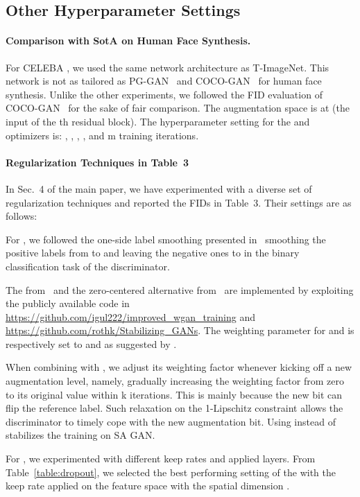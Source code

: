 \documentclass{article}
\begin{document}
\begin{center}
\subsection{Other Hyperparameter Settings}\label{subsec:regsettings}

\paragraph{Comparison with SotA on Human Face Synthesis.}
For CELEBA , we used the same network architecture as T-ImageNet. This network is not as tailored as PG-GAN~\cite{karras2018progressive} and COCO-GAN~\cite{lin2019cocogan} for human face synthesis. Unlike the other experiments, we followed the FID evaluation of COCO-GAN~\cite{lin2019cocogan} for the sake of fair comparison. The augmentation space is at  (the input of the th residual block). The hyperparameter setting for the  and  optimizers is: , , , ,  and \unit{m} training iterations.
\paragraph{Regularization Techniques in Table~3}
In Sec.~4 of the main paper, we have experimented with a diverse set of regularization techniques and reported the FIDs in Table~3. Their settings are as follows:

For , we followed the one-side label smoothing presented in~\cite{SalimansNIPS2016} smoothing the positive labels from  to  and leaving the negative ones to  in the binary classification task of the discriminator.

The  from~\cite{gulrajani_NIPS2017} and the zero-centered alternative  from~\cite{Roth_NIPS2017} are implemented by exploiting the publicly available code in \url{https://github.com/igul222/improved_wgan_training} and \url{https://github.com/rothk/Stabilizing_GANs}. The weighting parameter for  and  is respectively set to  and  as suggested by \cite{Kurach2018GANlandscape,Roth_NIPS2017}. 

When combining  with , we adjust its weighting factor whenever kicking off a new augmentation level, namely, gradually increasing the weighting factor from zero to its original value within \unit{k} iterations. This is mainly because the new bit can flip the reference label. Such relaxation on the 1-Lipschitz constraint allows the discriminator to timely cope with the new augmentation bit. Using  instead of  stabilizes the training on SA GAN.

For , we experimented with different keep rates and applied layers. From Table~\ref{table:dropout}, we selected the best performing setting of the  with the keep rate  applied on the feature space with the spatial dimension . 


\end{center}
\end{document}
